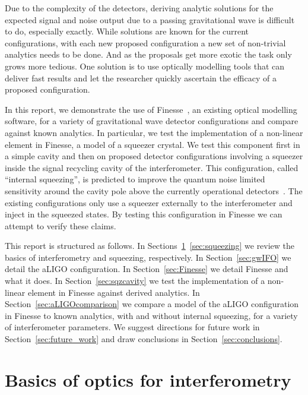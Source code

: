 \documentclass[aps,pra,superscriptaddress,reprint,nofootinbib]{revtex4-1}
\begin{document}
Due to the complexity of the detectors, deriving analytic solutions for the expected signal and noise output due to a passing gravitational wave is difficult to do, especially exactly. %
While solutions are known for the current configurations, with each new proposed configuration a new set of non-trivial analytics needs to be done. And as the proposals get more exotic the task only grows more tedious.
One solution is to use optically modelling tools that can deliver fast results and let the researcher quickly ascertain the efficacy of a proposed configuration. 


In this report, we demonstrate the use of Finesse~\cite{finesse}, an existing optical modelling software, for a variety of gravitational wave detector configurations and compare against known analytics. In particular, we test the implementation of a non-linear element in Finesse, a model of a squeezer crystal. We test this component first in a simple cavity and then on proposed detector configurations involving a squeezer inside the signal recycling cavity of the interferometer. This configuration, called ``internal squeezing'', is predicted to improve the quantum noise limited sensitivity around the cavity pole above the currently operational detectors~\cite{Korobko_2019,Adya_2020}. The existing configurations only use a squeezer externally to the interferometer and inject in the squeezed states. By testing this configuration in Finesse we can attempt to verify these claims. 


This report is structured as follows.
In Sections~\ref{sec:basics}~\ref{sec:squeezing} we review the basics of interferometry and squeezing, respectively. In Section~\ref{sec:gwIFO} we detail the aLIGO configuration.
In Section~\ref{sec:Finesse} we detail Finesse and what it does.
In Section~\ref{sec:sqzcavity} we test the implementation of a non-linear element in Finesse against derived analytics. %
In Section~\ref{sec:aLIGOcomparison} we compare a model of the aLIGO configuration in Finesse to known analytics, with and without internal squeezing, for a variety of interferometer parameters.
We suggest directions for future work in Section~\ref{sec:future_work} and draw conclusions in Section~\ref{sec:conclusions}.


\section{Basics of optics for interferometry}
\label{sec:basics}
\end{document}
